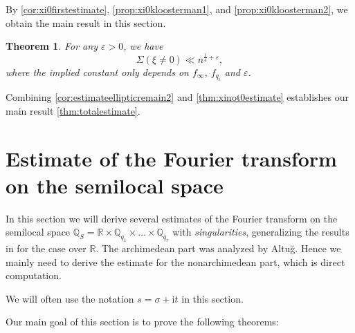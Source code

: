\documentclass[10pt,oneside,reqno]{amsart}
\newcommand\rmi{\mathrm{i}}
\newcommand\QQ{\mathbb{Q}}
\newcommand\RR{\mathbb{R}}
\theoremstyle{THEOREM}
\newtheorem{theorem}{Theorem}[section]
\theoremstyle{DEFINITION}
\theoremstyle{EXERCISE}
\numberwithin{equation}{section}
\begin{document}
By \autoref{cor:xi0firstestimate}, \autoref{prop:xi0kloosterman1}, and \autoref{prop:xi0kloosterman2}, we obtain the main result in this section.
\begin{theorem}\label{thm:xinot0estimate}
For any $\varepsilon>0$, we have
\[
\Sigma(\xi\neq 0)\ll n^{\frac14+\varepsilon},
\]
where the implied constant only depends on $f_\infty$, $f_{q_i}$ and $\varepsilon$.
\end{theorem}

Combining \autoref{cor:estimateellipticremain2} and \autoref{thm:xinot0estimate} establishes our main result \autoref{thm:totalestimate}.

\appendix
\section{Estimate of the Fourier transform on the semilocal space}\label{sec:fourier}
In this section we will derive several estimates of the Fourier transform on the semilocal space $\QQ_S=\RR\times\QQ_{q_1}\times  \dots\times \QQ_{q_r}$ with \emph{singularities}, generalizing the results in \cite[Appendix A]{altug2017} for the case over $\RR$. 
The archimedean part was analyzed by Altu\u{g}. Hence we mainly need to derive the estimate for the nonarchimedean part, which is direct computation. 

We will often use the notation $s=\sigma+\rmi t$ in this section.

Our main goal of this section is to prove the following theorems:
\end{document}
